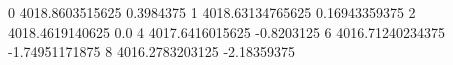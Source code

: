 0 4018.8603515625 0.3984375
1 4018.63134765625 0.16943359375
2 4018.4619140625 0.0
4 4017.6416015625 -0.8203125
6 4016.71240234375 -1.74951171875
8 4016.2783203125 -2.18359375

